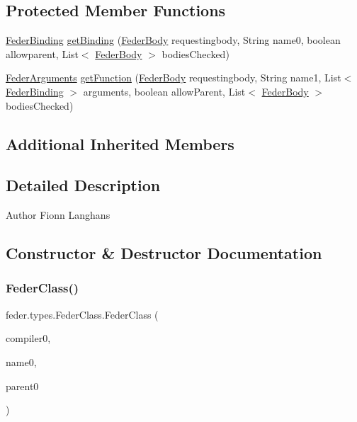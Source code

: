 \subsection*{Protected Member Functions}
\begin{DoxyCompactItemize}
\item 
\hyperlink{classfeder_1_1types_1_1FederBinding}{Feder\+Binding} \hyperlink{classfeder_1_1types_1_1FederClass_aa91ec183841e74c532a87ca8883cf782}{get\+Binding} (\hyperlink{classfeder_1_1types_1_1FederBody}{Feder\+Body} requestingbody, String name0, boolean allowparent, List$<$ \hyperlink{classfeder_1_1types_1_1FederBody}{Feder\+Body} $>$ bodies\+Checked)
\item 
\hyperlink{interfacefeder_1_1types_1_1FederArguments}{Feder\+Arguments} \hyperlink{classfeder_1_1types_1_1FederClass_a5863f07dc8fbadc8451439c50c9c8fd5}{get\+Function} (\hyperlink{classfeder_1_1types_1_1FederBody}{Feder\+Body} requestingbody, String name1, List$<$ \hyperlink{classfeder_1_1types_1_1FederBinding}{Feder\+Binding} $>$ arguments, boolean allow\+Parent, List$<$ \hyperlink{classfeder_1_1types_1_1FederBody}{Feder\+Body} $>$ bodies\+Checked)
\end{DoxyCompactItemize}
\subsection*{Additional Inherited Members}


\subsection{Detailed Description}
\begin{DoxyAuthor}{Author}
Fionn Langhans 
\end{DoxyAuthor}


\subsection{Constructor \& Destructor Documentation}
\mbox{\label{classfeder_1_1types_1_1FederClass_a6599d0085106c898b54f1d0586e24931}} 
\subsubsection{\texorpdfstring{Feder\+Class()}{FederClass()}\hspace{0.1cm}{\footnotesize\ttfamily [1/2]}}
{\footnotesize\ttfamily feder.\+types.\+Feder\+Class.\+Feder\+Class (\begin{DoxyParamCaption}\item[{\hyperlink{classfeder_1_1FederCompiler}{Feder\+Compiler}}]{compiler0,  }\item[{String}]{name0,  }\item[{\hyperlink{classfeder_1_1types_1_1FederBody}{Feder\+Body}}]{parent0 }\end{DoxyParamCaption})}


